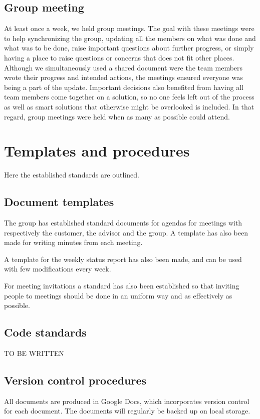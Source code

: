 \documentclass[11pt]{book}
\begin{document}
\subsection{Group meeting}
At least once a week, we held group meetings. The goal with these meetings were to help synchronizing the group, updating all the members on what was done and what was to be done, raise important questions about further progress, or simply having a place to raise questions or concerns that does not fit other places. Although we simultaneously used a shared document were the team members wrote their progress and intended actions, the meetings ensured everyone was being a part of the update. Important decisions also benefited from having all team members come together on a solution, so no one feels left out of the process as well as smart solutions that otherwise might be overlooked is included.  In that regard, group meetings were held when as many as possible could attend.

\section{Templates and procedures}
Here the established standards are outlined.

\subsection{Document templates}
The group has established standard documents for agendas for meetings with respectively the customer, the advisor and the group. A template has also been made for writing minutes from each meeting.

A template for the weekly status report has also been made, and can be used with few modifications every week.

For meeting invitations a standard has also been established so that inviting people to meetings should be done in an uniform way and as effectively as possible.

\subsection{Code standards}
TO BE WRITTEN

\subsection{Version control procedures}
All documents are produced in Google Docs, which incorporates version control for each document. The documents will regularly be backed up on local storage.
\end{document}
